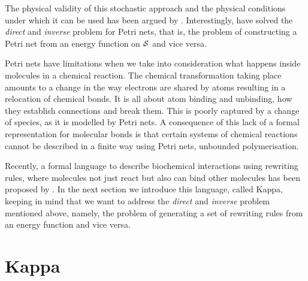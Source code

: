 The physical validity of this stochastic approach
and the physical conditions under which
it can be used has been argued by \citet{gillespie76}.
Interestingly, \citet{et2} have solved
the \emph{direct} and \emph{inverse} problem for Petri nets,
that is, the problem of constructing a Petri net
from an energy function on $\mathcal{S}$ and vice versa.

Petri nets have limitations when we take into consideration
what happens inside molecules in a chemical reaction.
The chemical transformation taking place amounts to
a change in the way electrons are shared by atoms
resulting in a relocation of chemical bonds.
It is all about atom binding and unbinding,
\ie how they establish connections and break them.
This is poorly captured by a change of species,
as it is modelled by Petri nets.
A consequence of this lack of a formal representation for
molecular bonds is that certain systems of chemical reactions
cannot be described in a finite way using Petri nets,
\eg unbounded polymerisation.

Recently,
a formal language to describe biochemical interactions
using rewriting rules,
where molecules not just react but also can bind other molecules
has been proposed by \citet{danoslaneve2002a}.
In the next section we introduce this language, called Kappa,
keeping in mind that we want to address
the \emph{direct} and \emph{inverse} problem mentioned above,
namely, the problem of generating a set of rewriting rules
from an energy function and vice versa.


\section{Kappa}

















